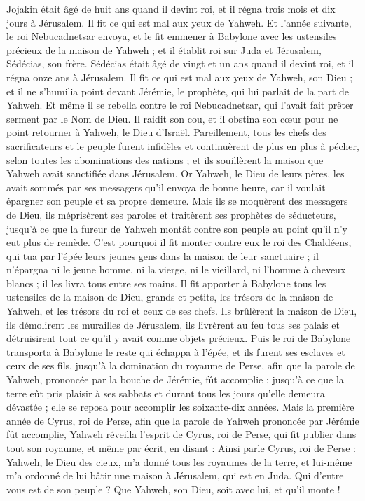 \begin{multicols}{2}
Jojakin était âgé de huit ans quand il devint roi, et il régna trois mois et dix jours à Jérusalem. Il fit ce qui est mal aux yeux de Yahweh.
Et l'année suivante, le roi Nebucadnetsar envoya, et le fit emmener à Babylone avec les ustensiles précieux de la maison de Yahweh ; et il établit roi sur Juda et Jérusalem, Sédécias, son frère.
Sédécias était âgé de vingt et un ans quand il devint roi, et il régna onze ans à Jérusalem.
Il fit ce qui est mal aux yeux de Yahweh, son Dieu ; et il ne s'humilia point devant Jérémie, le prophète, qui lui parlait de la part de Yahweh.
Et même il se rebella contre le roi Nebucadnetsar, qui l'avait fait prêter serment par le Nom de Dieu. Il raidit son cou, et il obstina son cœur pour ne point retourner à Yahweh, le Dieu d'Israël.
Pareillement, tous les chefs des sacrificateurs et le peuple furent infidèles et continuèrent de plus en plus à pécher, selon toutes les abominations des nations ; et ils souillèrent la maison que Yahweh avait sanctifiée dans Jérusalem.
Or Yahweh, le Dieu de leurs pères, les avait sommés par ses messagers qu'il envoya de bonne heure, car il voulait épargner son peuple et sa propre demeure.
Mais ils se moquèrent des messagers de Dieu, ils méprisèrent ses paroles et traitèrent ses prophètes de séducteurs, jusqu'à ce que la fureur de Yahweh montât contre son peuple au point qu'il n'y eut plus de remède.
C'est pourquoi il fit monter contre eux le roi des Chaldéens, qui tua par l'épée leurs jeunes gens dans la maison de leur sanctuaire ; il n'épargna ni le jeune homme, ni la vierge, ni le vieillard, ni l'homme à cheveux blancs ; il les livra tous entre ses mains.
Il fit apporter à Babylone tous les ustensiles de la maison de Dieu, grands et petits, les trésors de la maison de Yahweh, et les trésors du roi et ceux de ses chefs.
Ils brûlèrent la maison de Dieu, ils démolirent les murailles de Jérusalem, ils livrèrent au feu tous ses palais et détruisirent tout ce qu'il y avait comme objets précieux.
Puis le roi de Babylone transporta à Babylone le reste qui échappa à l'épée, et ils furent ses esclaves et ceux de ses fils, jusqu'à la domination du royaume de Perse,
afin que la parole de Yahweh, prononcée par la bouche de Jérémie, fût accomplie ; jusqu'à ce que la terre eût pris plaisir à ses sabbats et durant tous les jours qu'elle demeura dévastée ; elle se reposa pour accomplir les soixante-dix années.
Mais la première année de Cyrus, roi de Perse, afin que la parole de Yahweh prononcée par Jérémie fût accomplie, Yahweh réveilla l'esprit de Cyrus, roi de Perse, qui fit publier dans tout son royaume, et même par écrit, en disant :
Ainsi parle Cyrus, roi de Perse : Yahweh, le Dieu des cieux, m'a donné tous les royaumes de la terre, et lui-même m'a ordonné de lui bâtir une maison à Jérusalem, qui est en Juda. Qui d'entre vous est de son peuple ? Que Yahweh, son Dieu, soit avec lui, et qu'il monte !
\PPE{}
\end{multicols}
